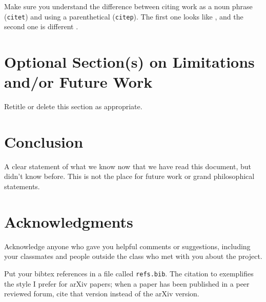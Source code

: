 \documentclass[11pt,letterpaper]{article}
\begin{document}
Make sure you understand the difference between citing work as a noun phrase (\texttt{citet}) and using a parenthetical (\texttt{citep}).  The first one looks like \citet{clark:2018:iui}, and the second one is different \citep{lin:2018:ghtc}.


\section{Optional Section(s) on Limitations and/or Future Work}

Retitle or delete this section as appropriate.

\section{Conclusion}

A clear statement of what we know now that we have read this document, but didn’t know before.  This is not the place for future work or grand philosophical statements.


\section*{Acknowledgments}

Acknowledge anyone who gave you helpful comments or suggestions, including your classmates and people outside the class who met with you about the project.

Put your bibtex references in a file called \texttt{refs.bib}.  The citation to \citet{press:2018:attention} exemplifies the style I prefer for arXiv papers; when a paper has been published in a peer reviewed forum, cite that version instead of the arXiv version.






\label{lastpage}
\end{document}
